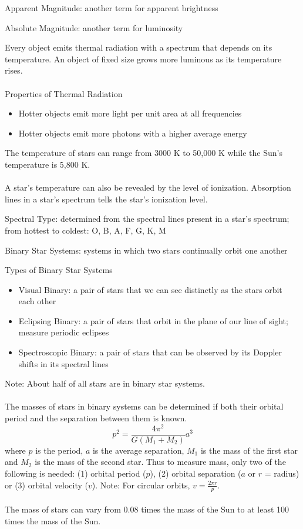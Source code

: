 \documentclass[12pt]{article}
\begin{document}
\begin{definition} Apparent Magnitude: another term for apparent brightness \end{definition}
\begin{definition} Absolute Magnitude: another term for luminosity \end{definition}
Every object emits thermal radiation with a spectrum that depends on its temperature. An object of fixed size grows more luminous as its temperature rises. \\~\\
Properties of Thermal Radiation \begin{itemize} 
\item Hotter objects emit more light per unit area at all frequencies
\item Hotter objects emit more photons with a higher average energy \end{itemize} 
The temperature of stars can range from 3000 K to 50,000 K while the Sun's temperature is 5,800 K. \\~\\
A star's temperature can also be revealed by the level of ionization. Absorption lines in a star's spectrum tells the star's ionization level. 
\begin{definition} Spectral Type: determined from the spectral lines present in a star's spectrum; from hottest to coldest: O, B, A, F, G, K, M  \end{definition}
\begin{definition} Binary Star Systems: systems in which two stars continually orbit one another \end{definition} 
Types of Binary Star Systems \begin{itemize} 
\item Visual Binary: a pair of stars that we can see distinctly as the stars orbit each other 
\item Eclipsing Binary: a pair of stars that orbit in the plane of our line of sight; measure periodic eclipses
\item Spectroscopic Binary: a pair of stars that can be observed by its Doppler shifts in its spectral lines \end{itemize} 
Note: About half of all stars are in binary star systems. \\~\\
The masses of stars in binary systems can be determined if both their orbital period and the separation between them is known. $$p^2 = \frac{4\pi^2}{G(M_1 + M_2)}a^3 $$ where $p$ is the period, $a$ is the average separation, $M_1$ is the mass of the first star and $M_2$ is the mass of the second star. Thus to measure mass, only two of the following is needed: (1) orbital period ($p$), (2) orbital separation ($a$ or $r$ = radius) or (3) orbital velocity ($v$). Note: For circular orbits, $v = \frac{2\pi r}{p} $. \\~\\ 
The mass of stars can vary from 0.08 times the mass of the Sun to at least 100 times the mass of the Sun. 
\end{document}

